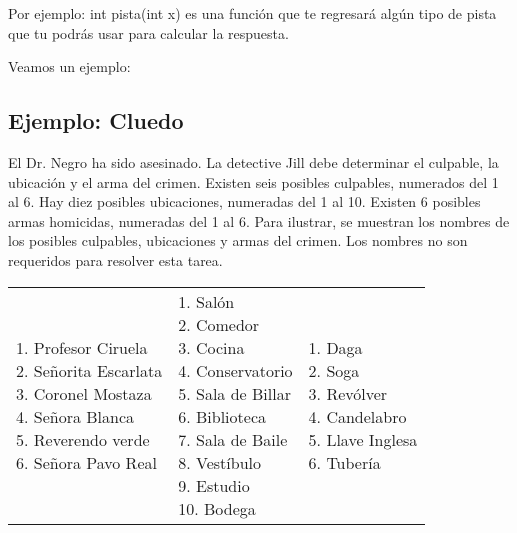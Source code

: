 Por ejemplo: int pista(int x) es una función que te regresará algún tipo de pista que tu podrás usar para calcular la respuesta.

Veamos un ejemplo:
\subsection*{Ejemplo: Cluedo}
El Dr. Negro ha sido asesinado. La detective Jill debe determinar el culpable, la ubicación y el arma del crimen. Existen seis posibles culpables, numerados del 1 al 6. Hay diez posibles ubicaciones, numeradas del 1 al 10. Existen 6 posibles armas homicidas, numeradas del 1 al 6. Para ilustrar, se muestran los nombres de los posibles culpables, ubicaciones y armas del crimen. Los nombres no son requeridos para resolver esta tarea.
\begin{center}
	\begin{scriptsize}
		\begin{tabular}{|l|l|l|}	
			\hline
			\thead{Culpable}&\thead{Ubicación}&\thead{Arma Homicida}\\
			\hline
			\makecell[l]{
				1. Profesor Ciruela\\
				2. Señorita Escarlata\\
				3. Coronel Mostaza\\
				4. Señora Blanca\\
				5. Reverendo verde\\
				6. Señora Pavo Real
			}&
			\makecell[l]{
				1. Salón\\
				2. Comedor\\
				3. Cocina\\
				4. Conservatorio\\
				5. Sala de Billar\\
				6. Biblioteca\\
				7. Sala de Baile \\
				8. Vestíbulo \\
				9. Estudio \\
				10. Bodega
			}&
			\makecell[l]{
				1. Daga\\
				2. Soga \\
				3. Revólver \\
				4. Candelabro\\
				5. Llave Inglesa \\
				6. Tubería
			}
			\\
			\hline
		\end{tabular}
	\end{scriptsize}
\end{center}

